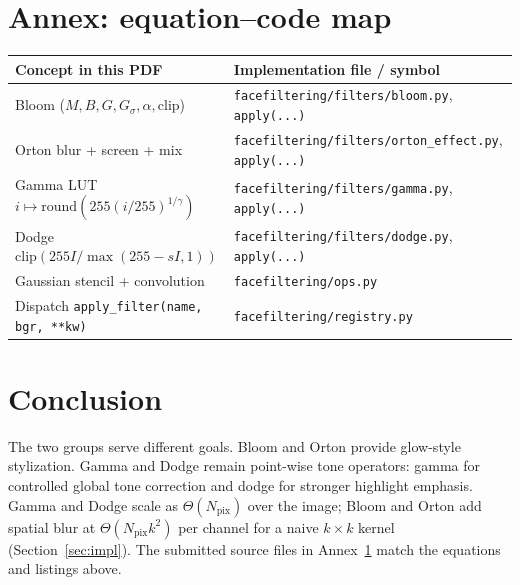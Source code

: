 \documentclass[11pt,a4paper]{article}
\begin{document}
\section{Annex: equation--code map}\label{sec:annex}
\begin{tabular}{@{}ll@{}}
\toprule
\textbf{Concept in this PDF} & \textbf{Implementation file / symbol} \\
\midrule
Bloom (\(M,B,G,G_\sigma,\alpha,\mathrm{clip}\)) & \texttt{facefiltering/filters/bloom.py}, \texttt{apply(...)} \\
Orton blur + screen + mix & \texttt{facefiltering/filters/orton\_effect.py}, \texttt{apply(...)} \\
Gamma LUT \(i\mapsto \mathrm{round}(255(i/255)^{1/\gamma})\) & \texttt{facefiltering/filters/gamma.py}, \texttt{apply(...)} \\
Dodge \(\mathrm{clip}(255I/\max(255-sI,1))\) & \texttt{facefiltering/filters/dodge.py}, \texttt{apply(...)} \\
Gaussian stencil + convolution & \texttt{facefiltering/ops.py} \\
Dispatch \texttt{apply\_filter(name, bgr, **kw)} & \texttt{facefiltering/registry.py} \\
\bottomrule
\end{tabular}

\section{Conclusion}
The two groups serve different goals. Bloom and Orton provide glow-style stylization. Gamma and Dodge remain point-wise tone
operators: gamma for controlled global tone correction and dodge for stronger highlight emphasis.
Gamma and Dodge scale as \(\Theta(N_{\mathrm{pix}})\) over the image; Bloom and Orton add spatial blur at \(\Theta(N_{\mathrm{pix}}k^2)\) per channel for a naive \(k\times k\) kernel (Section~\ref{sec:impl}). The submitted source files in Annex~\ref{sec:annex} match the equations and listings above.
\end{document}
